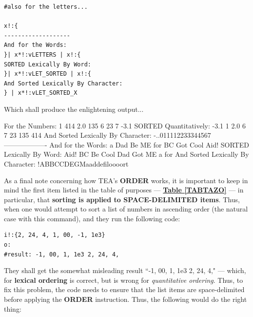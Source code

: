 \documentclass[a4paper, 18pt]{book} %
\begin{document}
{\begin{tcolorbox}[teaterminalstyle, title=O: EXAMPLE 8: All Kinds of Sorting for Data in Vaults, breakable]
\begin{lstlisting}[language=TEA,breaklines=true,]
#also for the letters...

x!:{
-------------------
And for the Words:
}| x*!:vLETTERS | x!:{
SORTED Lexically By Word:
}| x*!:vLET_SORTED | x!:{
And Sorted Lexically By Character:
} | x*!:vLET_SORTED_X
   \end{lstlisting}
  \end{tcolorbox}


\vspace{2em}


Which shall produce the enlightening output...


  \begin{tcbverbatim}[title=Output from Example 8]
For the Numbers:
1 414 2.0 135 6 23 7 -3.1
SORTED Quantitatively:
-3.1 1 2.0 6 7 23 135 414
And Sorted Lexically By Character:
       -..011112233344567
-------------------
And for the Words:
a Dad Be ME for BC Got Cool Aid!
SORTED Lexically By Word:
Aid! BC Be Cool Dad Got ME a for
And Sorted Lexically By Character:
        !ABBCCDEGMaaddefiloooort
  \end{tcbverbatim}


\vspace{2em}

As a final note concerning how TEA's \textbf{ORDER} works, it is important to keep in mind the first item listed in the table of purposes --- \textbf{\hyperref[TABTAZO]{Table \ref{TABTAZO}}} --- in particular, that \textbf{sorting is applied to SPACE-DELIMITED items}. Thus, when one would attempt to sort a list of numbers in ascending order (the natural case with this command), and they run the following code:


\vspace{2em}

  \begin{tcolorbox}[teaterminalstyle, title=O: EXAMPLE 9: Sorting Numbers BUT with INVALID FORMATTING, breakable]
  \begin{lstlisting}[language=TEA,breaklines=true,]
i!:{2, 24, 4, 1, 00, -1, 1e3}
o:
#result: -1, 00, 1, 1e3 2, 24, 4,
   \end{lstlisting}
  \end{tcolorbox}


\vspace{1em}



They shall get the somewhat misleading result ``-1, 00, 1, 1e3 2, 24, 4," --- which, for \textbf{lexical ordering} is correct, but is wrong for \textit{quantitative ordering}. Thus, to fix this problem, the code needs to ensure that the list items are space-delimited before applying the \textbf{ORDER} instruction. Thus, the following would do the right thing:

}
\end{document}
